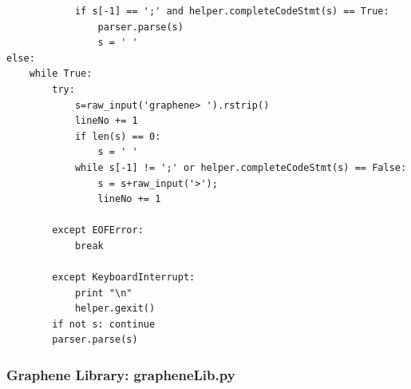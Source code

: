 \documentclass[a4paper]{article}
\begin{document}
\begin{verbatim}
            if s[-1] == ';' and helper.completeCodeStmt(s) == True:
                parser.parse(s)
                s = ' '
else:
    while True:
        try:
            s=raw_input('graphene> ').rstrip()
            lineNo += 1
            if len(s) == 0:
                s = ' '
            while s[-1] != ';' or helper.completeCodeStmt(s) == False:
                s = s+raw_input('>');
                lineNo += 1

        except EOFError:
            break

        except KeyboardInterrupt:
            print "\n"
            helper.gexit()
        if not s: continue
        parser.parse(s)

\end{verbatim}
\subsubsection{Graphene Library: grapheneLib.py}
\end{document}
